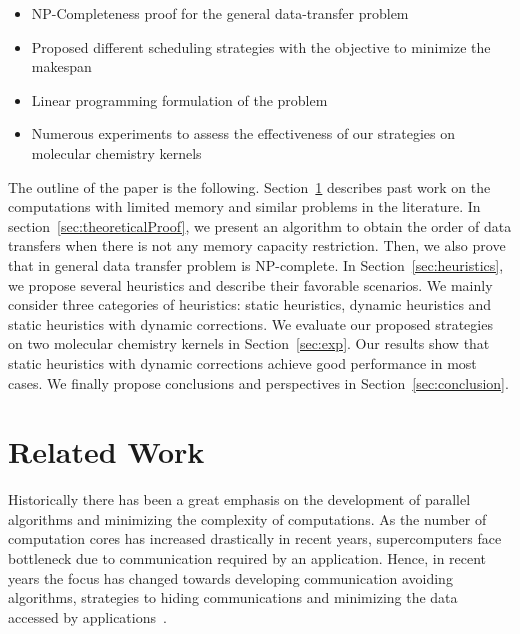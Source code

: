 \documentclass[sigconf]{acmart}
\begin{document}
	
	\renewcommand{\labelitemi}{$\bullet$}
	\begin{itemize}
		\item NP-Completeness proof for the general data-transfer problem 
		\item Proposed different scheduling strategies with the objective to minimize the makespan
		\item Linear programming formulation of the problem
		\item Numerous experiments to assess the effectiveness of our strategies on molecular chemistry kernels 
	\end{itemize}
	
	The outline of the paper is the following. Section~\ref{sec:relatedWork} describes past work on the computations with limited memory and similar problems in the literature. In section~\ref{sec:theoreticalProof}, we present an algorithm to obtain the order of data transfers when there is not any memory capacity restriction. Then, we also prove that in general data transfer problem is NP-complete. In Section~\ref{sec:heuristics}, we propose several heuristics and describe their favorable scenarios. We mainly consider three categories of heuristics: static heuristics, dynamic heuristics and static heuristics with dynamic corrections. We evaluate our proposed strategies on two molecular chemistry kernels in Section~\ref{sec:exp}. Our results show that static heuristics with dynamic corrections achieve good performance in most cases. We finally propose conclusions and perspectives in Section~\ref{sec:conclusion}.
	
	\section{Related Work}
	\label{sec:relatedWork}
	
	Historically there has been a great emphasis on the development of parallel algorithms and minimizing the complexity of computations. As the number of computation cores has increased drastically in recent years, supercomputers face bottleneck due to communication required by an application. Hence, in recent years the focus has changed towards developing communication avoiding algorithms, strategies to hiding communications and minimizing the data accessed by applications~\cite{yelick2016}. 
	
\end{document}
